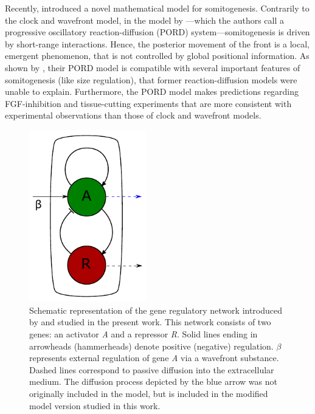 \documentclass[%
 preprint,
 amsmath,amssymb,
 aps,
]{revtex4-2}
\begin{document}
	Recently, \citet{Cotterell2015} introduced a novel mathematical model for
	somitogenesis. Contrarily to the clock and wavefront model, in the model by
	\citeauthor{Cotterell2015}---which the authors call a progressive oscillatory
	reaction-diffusion (PORD) system---somitogenesis is driven by short-range
	interactions. Hence, the posterior movement of the front is a local, emergent
	phenomenon, that is not controlled by global positional information. As shown by
	\citeauthor{Cotterell2015}, their PORD model is compatible with several
	important features of somitogenesis (like size regulation), that former
	reaction-diffusion models were unable to explain. Furthermore, the PORD model
	makes predictions regarding FGF-inhibition and tissue-cutting experiments that
	are more consistent with experimental observations than those of clock and
	wavefront models.
	
	\begin{figure}[t!]
		\centering
		\includegraphics[width=2in]{Figures/Fig01.pdf}
		\caption{Schematic representation of the gene regulatory network introduced by
			\citep{Cotterell2015} and studied in the present work. This network consists of
			two genes: an activator \textit{A} and a repressor \textit{R}. Solid lines
			ending in arrowheads (hammerheads) denote positive (negative) regulation.
			$\beta$ represents external regulation of gene \textit{A} via a wavefront
			substance. Dashed lines correspond to passive diffusion into the extracellular
			medium. The diffusion process depicted by the blue arrow was not
			originally included in the \citeauthor{Cotterell2015} model, but is 
			included in the modified model version studied in this work.}
		\label{Fig01}
	\end{figure}
	
\end{document}
